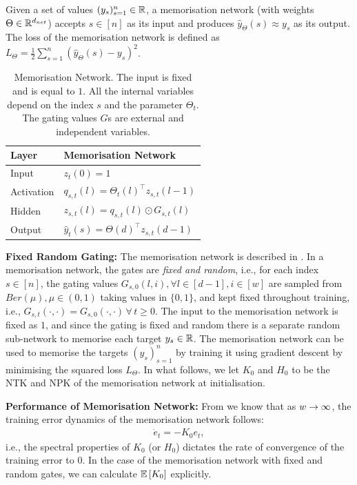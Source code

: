 \begin{appendix}
\begin{definition}
Given a set of values $(y_s)_{s=1}^n\in  \mathbb{R}$, a memorisation network (with weights $\Theta\in\mathbb{R}^{d_{net}}$) accepts $s\in[n]$ as its input and produces $\hat{y}_{\Theta}(s)\approx y_s$ as its output. The loss of the memorisation network is defined as $L_{\Theta}=\frac{1}{2}\sum_{s=1}^n (\hat{y}_{\Theta}(s)-y_s)^2$.
\end{definition}
\FloatBarrier
\begin{table}[h]
\centering
\begin{tabular}{| l |  l  |}\hline
Layer&  Memorisation Network\\\hline
Input  &$z_{t}(0)=1$ \\
Activation & $q_{s,t}(l)={\Theta_t(l)}^\top z_{s,t}(l-1)$\\
Hidden & $z_{s,t}(l)=q_{s,t}(l)\odot G_{s,t}(l)$ \\
Output & $\hat{y}_t(s)={\Theta(d)}^\top z_{s,t}(d-1)$\\\hline
\end{tabular}
\caption{ Memorisation Network. The input is fixed and is equal to $1$. All the internal variables depend on the index $s$ and the parameter $\Theta_t$. The gating values $G$s are external and independent variables.}
\label{tb:dgnmemo}
\end{table}

\textbf{Fixed Random Gating:} The memorisation network is described in . In a memorisation network, the gates are \emph{fixed and random}, i.e., for each index $s\in[n]$, the gating values $G_{s,0}(l,i),\forall l\in[d-1], i\in[w] $ are sampled from $Ber(\mu), \mu\in(0,1)$ taking values in $\{0,1\}$,  and kept fixed throughout training, i.e., $G_{s,t}(\cdot,\cdot)=G_{s,0}(\cdot,\cdot)\,\forall\,t\geq 0$. The input to the memorisation network is fixed as $1$, and since the gating is fixed and random there is a separate random sub-network to memorise each target $y_s\in\mathbb{R}$. The memorisation network can be used to memorise the targets  $(y_s)_{s=1}^n$ by training it using gradient descent by minimising the squared loss $L_{\Theta}$. In what follows, we let $K_0$ and $H_0$ to be the NTK and NPK of the memorisation network at initialisation.


\textbf{Performance of Memorisation Network:} From  we know that as $w\rightarrow\infty$, the training error dynamics of the memorisation network follows:
\begin{align}
\dot{e}_t=-K_{0} e_t,
\end{align}
i.e., the spectral properties of $K_0$ (or $H_0$) dictates the rate of convergence of the training error to $0$. In the case of the memorisation network with fixed and random gates, we can calculate $\mathbb{E}\left[K_0\right]$ explicitly. 


\end{appendix}
